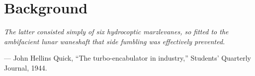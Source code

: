 \chapter{Background}
\label{chap:background}

\setlength{\epigraphwidth}{0.7\textwidth}
\epigraph{ \it
    The latter consisted simply of six hydrocoptic marzlevanes, so fitted to the ambifacient lunar waneshaft that side fumbling was effectively prevented.
}{--- John Hellins Quick, ``The turbo-encabulator in industry,'' Students' Quarterly Journal, 1944.}





